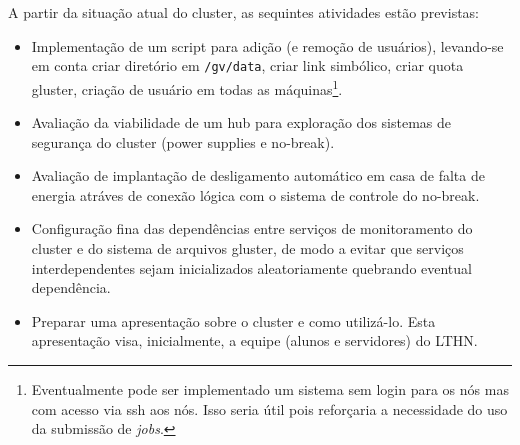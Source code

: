 A partir da situação atual do cluster, as sequintes atividades estão previstas:
\begin{itemize}
	\item[1] Implementação de um script para adição (e remoção de usuários), levando-se em conta criar diretório em \texttt{/gv/data}, criar link simbólico, criar quota gluster, criação de usuário em todas as máquinas\footnote{Eventualmente pode ser implementado um sistema sem login para os nós mas com acesso via ssh aos nós. Isso seria útil pois reforçaria a necessidade do uso da submissão de \textit{jobs}.}.
	\item[2] Avaliação da viabilidade de um hub para exploração dos sistemas de segurança do cluster (power supplies e no-break).
	\item[3] Avaliação de implantação de desligamento automático em casa de falta de energia atráves de conexão lógica com o sistema de controle do no-break.
	\item[4] Configuração fina das dependências entre serviços de monitoramento 
	do cluster e do sistema de arquivos gluster, de modo a evitar que serviços 
	interdependentes sejam inicializados aleatoriamente quebrando eventual 
	dependência.
	\item[5] Preparar uma apresentação sobre o cluster e como utilizá-lo. Esta apresentação visa, inicialmente, a equipe (alunos e servidores) do LTHN.
\end{itemize}

